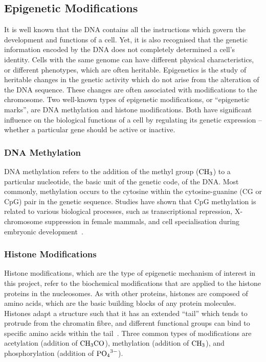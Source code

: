 \documentclass[12pt]{article}
\begin{document}
\subsection{Epigenetic Modifications}
It is well known that the DNA contains all the instructions which govern the development and functions of a cell. Yet, it is also recognised that the genetic information encoded by the DNA does not completely determined a cell's identity. Cells with the same genome can have different physical characteristics, or different phenotypes, which are often heritable. Epigenetics is the study of heritable changes in the genetic activity which do not arise from the alteration of the DNA sequence\cite{DNABook, probst2009}. These changes are often associated with modifications to the chromosome. Two well-known types of epigenetic modifications, or ``epigenetic marks'', are DNA methylation and histone modifications. Both have significant influence on the biological functions of a cell by regulating its genetic expression -- whether a particular gene should be active or inactive. 

\subsubsection{DNA Methylation}
DNA methylation refers to the addition of the methyl group ($\ce{CH3}$) to a particular nucleotide, the basic unit of the genetic code, of the DNA. Most commonly, methylation occurs to the cytosine within the cytosine-guanine (CG or CpG) pair in the genetic sequence. Studies have shown that CpG methylation is related to various biological processes, such as transcriptional repression, X-chromosome suppression in female mammals, and cell specialisation during embryonic development~\cite{DNABook}. 

\subsubsection{Histone Modifications}
\label{sec:histone}
Histone modifications, which are the type of epigenetic mechanism of interest in this project, refer to the biochemical modifications that are applied to the histone proteins in the nucleosomes. As with other proteins, histones are composed of amino acids, which are the basic building blocks of any protein molecules. Histones adapt a structure such that it has an extended ``tail'' which tends to protrude from the chromatin fibre, and different functional groups can bind to specific amino acids within the tail~\cite{strahl2000}. Three common types of modifications are acetylation (addition of $\ce{CH3CO}$), methylation (addition of $\ce{CH3}$), and phosphorylation (addition of $\ce{PO4^{3-}}$). 
\end{document}
